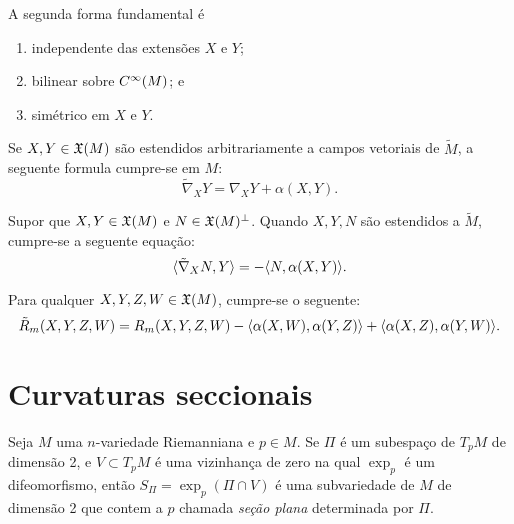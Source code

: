 \begin{lema}
	A segunda forma fundamental é
	\begin{enumerate}
		\item independente das extensões $X$ e $Y$;
		\item bilinear sobre $C^\infty(M)$; e
		\item simétrico em $X$ e $Y$.
	\end{enumerate}
\end{lema}

\begin{teorema}
	Se $X,Y \in \mathfrak{X}(M)$ são estendidos arbitrariamente a campos vetoriais de $\tilde{M}$, a seguente formula cumpre-se em $M$:
	\begin{equation*}
		\tilde{\nabla}_X Y = \nabla_X Y + \alpha(X,Y).
	\end{equation*}
\end{teorema}

\begin{lema}
	Supor que $X,Y \in \mathfrak{X}(M)$ e $N \in \mathfrak{X}(M)^\perp$. Quando $X,Y,N$ são estendidos a $\tilde{M}$, cumpre-se a seguente equação:
	\begin{equation*}
		\langle \tilde{\nabla}_X N,Y \rangle = -\langle N,\alpha(X,Y) \rangle.
	\end{equation*}
\end{lema}

\begin{teorema}
	Para qualquer $X,Y,Z,W \in \mathfrak{X}(M)$, cumpre-se o seguente:
	\begin{equation*}
		\tilde{R}_m(X,Y,Z,W) = R_m(X,Y,Z,W) - \langle \alpha(X,W),\alpha(Y,Z) \rangle + \langle \alpha(X,Z),\alpha(Y,W) \rangle.
	\end{equation*}
\end{teorema}

\section{Curvaturas seccionais}

\begin{definicao}
	Seja $M$ uma $n$-variedade Riemanniana e $p \in M$. Se $\Pi$ é um subespaço de $T_p M$ de dimensão 2, e $V \subset T_p M$ é uma vizinhança de zero  na qual $\exp_p$ é um difeomorfismo, então $S_{\Pi} = \exp_p(\Pi \cap V)$ é uma subvariedade de $M$ de dimensão 2 que contem a  $p$ chamada \emph{seção plana} determinada por $\Pi$.
\end{definicao}

